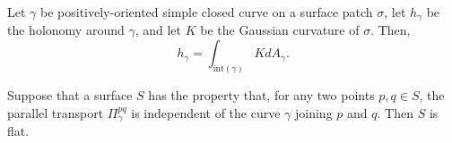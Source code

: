 \begin{theorem}
  Let $\gamma$ be positively-oriented simple closed curve on a surface patch $\sigma$,
  let $h_{\gamma}$ be the holonomy around $\gamma$,
  and let $K$ be the Gaussian curvature of $\sigma$.
  Then,
  \[
    h_{\gamma}   = \int_{\text{int}(\gamma)} K dA_{\gamma}.
  \]
\end{theorem}

\begin{proposition}
  Suppose that a surface $S$ has the property that, for any two points $p, q \in S$,
  the parallel transport $\Pi_{\gamma}^{pq}$ is independent of the curve $\gamma$ joining $p$ and $q$.
  Then $S$ is flat.
\end{proposition}

